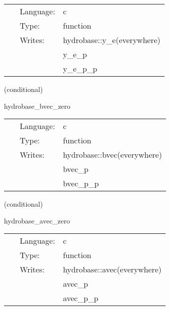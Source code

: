 \hspace{5mm}

 \begin{tabular*}{160mm}{cll} 
~ & Language:  & c \\ 
~ & Type:  & function \\ 
~ & Writes:  & hydrobase::y\_e(everywhere) \\ 
~& ~ &y\_e\_p\\ 
~& ~ &y\_e\_p\_p\\ 
\end{tabular*} 


\vspace{5mm}

   (conditional) 

\hspace{5mm} hydrobase\_bvec\_zero 

\hspace{5mm}{\it set magnetic field to 0 } 


\hspace{5mm}

 \begin{tabular*}{160mm}{cll} 
~ & Language:  & c \\ 
~ & Type:  & function \\ 
~ & Writes:  & hydrobase::bvec(everywhere) \\ 
~& ~ &bvec\_p\\ 
~& ~ &bvec\_p\_p\\ 
\end{tabular*} 


\vspace{5mm}

   (conditional) 

\hspace{5mm} hydrobase\_avec\_zero 

\hspace{5mm}{\it set vector potential to 0 } 


\hspace{5mm}

 \begin{tabular*}{160mm}{cll} 
~ & Language:  & c \\ 
~ & Type:  & function \\ 
~ & Writes:  & hydrobase::avec(everywhere) \\ 
~& ~ &avec\_p\\ 
~& ~ &avec\_p\_p\\ 
\end{tabular*} 


